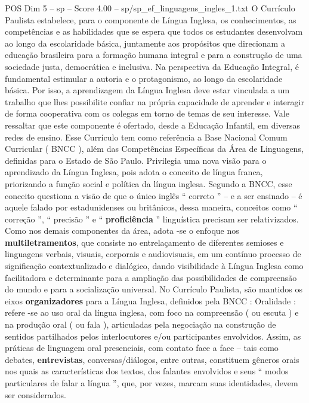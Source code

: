 \begin{textsample}{POS Dim 5 – sp – Score 4.00 – sp/sp\_ef\_linguagens\_ingles\_1.txt}  \label{ex:f5_pos_079}
O Currículo Paulista estabelece, para o componente de Língua Inglesa, os conhecimentos, as competências e as habilidades que se espera que todos os estudantes desenvolvam ao longo da escolaridade básica, juntamente aos propósitos que direcionam a educação brasileira para a formação humana integral e para a construção de uma sociedade justa, democrática e inclusiva.
Na perspectiva da Educação Integral, é fundamental estimular a autoria e o protagonismo, ao longo da escolaridade básica.
Por isso, a aprendizagem da Língua Inglesa deve estar vinculada a um trabalho que lhes possibilite confiar na própria capacidade de aprender e interagir de forma cooperativa com os colegas em torno de temas de seu interesse.
Vale ressaltar que este componente é ofertado, desde a Educação Infantil, em diversas redes de ensino.
Esse Currículo tem como referência a Base Nacional Comum Curricular ( BNCC ), além das Competências Específicas da Área de Linguagens, definidas para o Estado de São Paulo.
Privilegia uma nova visão para o aprendizado da Língua Inglesa, pois adota o conceito de língua franca, priorizando a função social e política da língua inglesa.
Segundo a BNCC, esse conceito questiona a visão de que o único inglês “ correto ” – e a ser ensinado – é aquele falado por estadunidenses ou britânicos, dessa maneira, conceitos como “ correção ”, “ precisão ” e “ \textbf{proficiência} ” linguística precisam ser relativizados.
Como nos demais componentes da área, adota -se o enfoque nos \textbf{multiletramentos}, que consiste no entrelaçamento de diferentes semioses e linguagens verbais, visuais, corporais e audiovisuais, em um contínuo processo de significação contextualizado e dialógico, dando visibilidade à Língua Inglesa como facilitadora e determinante para a ampliação das possibilidades de compreensão do mundo e para a socialização universal.
No Currículo Paulista, são mantidos os eixos \textbf{organizadores} para a Língua Inglesa, definidos pela BNCC : Oralidade : refere -se ao uso oral da língua inglesa, com foco na compreensão ( ou escuta ) e na produção oral ( ou fala ), articuladas pela negociação na construção de sentidos partilhados pelos interlocutores e/ou participantes envolvidos.
Assim, as práticas de linguagem oral presenciais, com contato face a face – tais como debates, \textbf{entrevistas}, conversas/diálogos, entre outras, constituem gêneros orais nos quais as características dos textos, dos falantes envolvidos e seus “ modos particulares de falar a língua ”, que, por vezes, marcam suas identidades, devem ser considerados.

\end{textsample}
